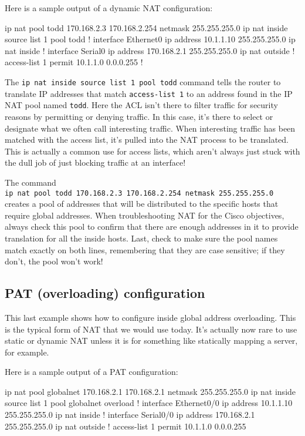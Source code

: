 Here is a sample output of a dynamic NAT configuration:

\begin{cli}
ip nat pool todd 170.168.2.3 170.168.2.254
netmask 255.255.255.0
ip nat inside source list 1 pool todd
!
interface Ethernet0
 ip address 10.1.1.10 255.255.255.0
 ip nat inside
!
interface Serial0
 ip address 170.168.2.1 255.255.255.0
 ip nat outside
!
access-list 1 permit 10.1.1.0 0.0.0.255
!
\end{cli}

The \texttt{ip\ nat\ inside\ source\ list\ 1\ pool\ todd} command tells
the router to translate IP addresses that match \texttt{access-list\ 1}
to an address found in the IP NAT pool named \texttt{todd}. Here the ACL
isn't there to filter traffic for security reasons by permitting or
denying traffic. In this case, it's there to select or designate what we
often call interesting traffic. When interesting traffic has been
matched with the access list, it's pulled into the NAT process to be
translated. This is actually a common use for access lists, which aren't
always just stuck with the dull job of just blocking traffic at an
interface!

The command
\texttt{ip\ nat\ pool\ todd\ 170.168.2.3\ 170.168.2.254\ netmask\ 255.255.255.0}
creates a pool of addresses that will be distributed to the specific
hosts that require global addresses. When troubleshooting NAT for the
Cisco objectives, always check this pool to confirm that there are
enough addresses in it to provide translation for all the inside hosts.
Last, check to make sure the pool names match exactly on both lines,
remembering that they are case sensitive; if they don't, the pool won't
work!



\subsection{PAT (overloading) configuration}

This last example shows how to configure inside global address
overloading. This is the typical form of NAT that we would use today.
It's actually now rare to use static or dynamic NAT unless it is for
something like statically mapping a server, for example.

Here is a sample output of a PAT configuration:

\begin{cli}
ip nat pool globalnet 170.168.2.1 170.168.2.1 netmask 255.255.255.0
ip nat inside source list 1 pool globalnet overload
!
interface Ethernet0/0
 ip address 10.1.1.10 255.255.255.0
 ip nat inside
!
interface Serial0/0
 ip address 170.168.2.1 255.255.255.0
 ip nat outside
!
access-list 1 permit 10.1.1.0 0.0.0.255
\end{cli}

